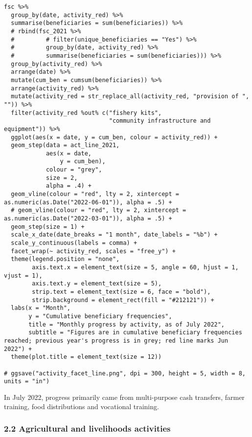 \documentclass[
]{article}
\begin{document}
\begin{verbatim}
fsc %>% 
  group_by(date, activity_red) %>% 
  summarise(beneficiaries = sum(beneficiaries)) %>% 
  # rbind(fsc_2021 %>% 
  #         # filter(unique_beneficiaries == "Yes") %>%
  #         group_by(date, activity_red) %>% 
  #         summarise(beneficiaries = sum(beneficiaries))) %>% 
  group_by(activity_red) %>% 
  arrange(date) %>% 
  mutate(cum_ben = cumsum(beneficiaries)) %>% 
  arrange(activity_red) %>% 
  mutate(activity_red = str_replace_all(activity_red, "provision of ", "")) %>%
  filter(activity_red %out% c("fishery kits", 
                              "community infrastructure and equipment")) %>% 
  ggplot(aes(x = date, y = cum_ben, colour = activity_red)) +
  geom_step(data = act_line_2021, 
            aes(x = date, 
                y = cum_ben), 
            colour = "grey",
            size = 2, 
            alpha = .4) + 
  geom_vline(colour = "red", lty = 2, xintercept = as.numeric(as.Date("2022-06-01")), alpha = .5) +
  # geom_vline(colour = "red", lty = 2, xintercept = as.numeric(as.Date("2022-03-01")), alpha = .5) +
  geom_step(size = 1) + 
  scale_x_date(date_breaks = "1 month", date_labels = "%b") +
  scale_y_continuous(labels = comma) +
  facet_wrap(~ activity_red, scales = "free_y") +
  theme(legend.position = "none",
        axis.text.x = element_text(size = 5, angle = 60, hjust = 1, vjust = 1), 
        axis.text.y = element_text(size = 5), 
        strip.text = element_text(size = 6, face = "bold"),
        strip.background = element_rect(fill = "#212121")) + 
  labs(x = "Month", 
       y = "Cumulative beneficiary frequencies", 
       title = "Monthly progress by activity, as of July 2022",
       subtitle = "Figures are in cumulative beneficiary frequencies reached; previous year's progress is in grey; red line marks Jun 2022") +
  theme(plot.title = element_text(size = 12)) 
  
# ggsave("activity_facet_line.png", dpi = 300, height = 5, width = 8, units = "in")  
\end{verbatim}

In July 2022, progress primarily came from multi-purpose cash transfers,
farmer training, food distributions and vocational training.

\hypertarget{agricultural-and-livelihoods-activities}{%
\subsubsection{2.2 Agricultural and livelihoods
activities}\label{agricultural-and-livelihoods-activities}}
\end{document}
